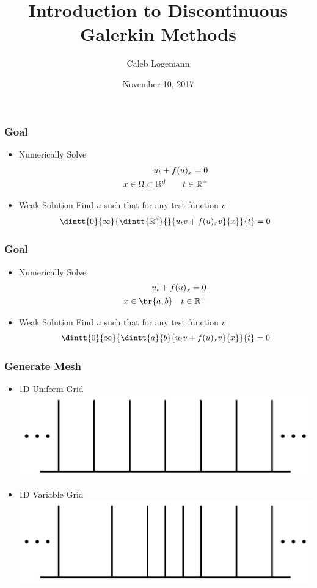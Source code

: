 \documentclass[10pt]{beamer}
\title[]{Introduction to Discontinuous Galerkin Methods} %
\author{Caleb Logemann} %
\institute[Iowa State University]{%
Mathematics Department, Iowa State University \\ %
\medskip
\textit{logemann@iastate.edu}} %
\date{November 10, 2017} %
\begin{document}
  \begin{frame}
    \titlepage{}
  \end{frame}

  \begin{frame}
    \frametitle{Goal}
    \begin{itemize}
      \item Numerically Solve
        \begin{align*}
          u_t + f(u)_x = 0 \\
          x \in \Omega \subset \mathbb{R}^d \qquad t \in \mathbb{R}^+
        \end{align*}

      \item Weak Solution
        Find $u$ such that for any test function $v$
        \[
          \dintt{0}{\infty}{\dintt{\RR^d}{}{u_t v + f(u)_x v}{x}}{t} = 0
        \]
    \end{itemize}
  \end{frame}

  \begin{frame}
    \frametitle{Goal}
    \begin{itemize}
      \item Numerically Solve
        \begin{align*}
          u_t + f(u)_x = 0 \\
          x \in \br{a, b} \quad t \in \RR^+
        \end{align*}

      \item Weak Solution
        Find $u$ such that for any test function $v$
        \[
          \dintt{0}{\infty}{\dintt{a}{b}{u_t v + f(u)_x v}{x}}{t} = 0
        \]
    \end{itemize}
  \end{frame}

  \begin{frame}
    \frametitle{Generate Mesh}
    \begin{itemize}
      \item 1D Uniform Grid
          \includegraphics[scale=0.3]{Figures/1Dgrid}
      \item 1D Variable Grid
          \includegraphics[scale=0.3]{Figures/1Dgrid_nonuniform}
    \end{itemize}
  \end{frame}
\end{document}

